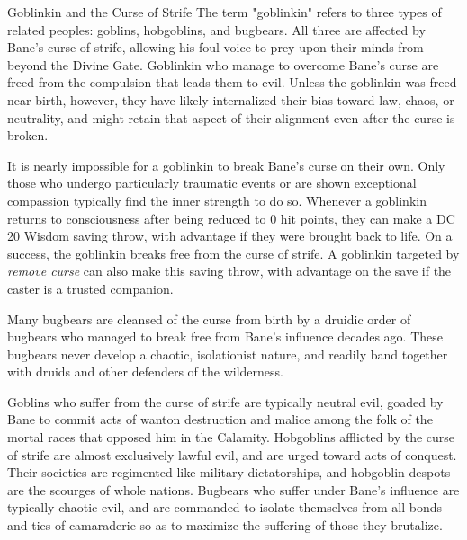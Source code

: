 \documentclass[10pt,a4paper,twoside,bg=print,twocolumn,openany,nodeprecatedcode]{dndbook}
\begin{document}
\begin{DndSidebar}[float=!b]{Goblinkin and the Curse of Strife}
The term "goblinkin" refers to three types of related peoples: goblins, hobgoblins, and bugbears. All three are affected by Bane's curse of strife, allowing his foul voice to prey upon their minds from beyond the Divine Gate. Goblinkin who manage to overcome Bane's curse are freed from the compulsion that leads them to evil. Unless the goblinkin was freed near birth, however, they have likely internalized their bias toward law, chaos, or neutrality, and might retain that aspect of their alignment even after the curse is broken.



It is nearly impossible for a goblinkin to break Bane's curse on their own. Only those who undergo particularly traumatic events or are shown exceptional compassion typically find the inner strength to do so. Whenever a goblinkin returns to consciousness after being reduced to 0 hit points, they can make a DC 20 Wisdom saving throw, with advantage if they were brought back to life. On a success, the goblinkin breaks free from the curse of strife. A goblinkin targeted by \textit{remove curse} can also make this saving throw, with advantage on the save if the caster is a trusted companion.



Many bugbears are cleansed of the curse from birth by a druidic order of bugbears who managed to break free from Bane's influence decades ago. These bugbears never develop a chaotic, isolationist nature, and readily band together with druids and other defenders of the wilderness.



Goblins who suffer from the curse of strife are typically neutral evil, goaded by Bane to commit acts of wanton destruction and malice among the folk of the mortal races that opposed him in the Calamity. Hobgoblins afflicted by the curse of strife are almost exclusively lawful evil, and are urged toward acts of conquest. Their societies are regimented like military dictatorships, and hobgoblin despots are the scourges of whole nations. Bugbears who suffer under Bane's influence are typically chaotic evil, and are commanded to isolate themselves from all bonds and ties of camaraderie so as to maximize the suffering of those they brutalize.



\end{DndSidebar}
\end{document}
